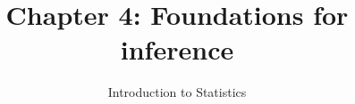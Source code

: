 \documentclass[slidestop,compress,mathserif]{beamer}
\title[Chp 4: Foundations for inference]{Chapter 4: Foundations for inference}
\author{Introduction to Statistics}
\date{}
\institute{}
\begin{document}


\begin{frame}[plain]

\titlepage

\end{frame}






%
%


\end{document}

